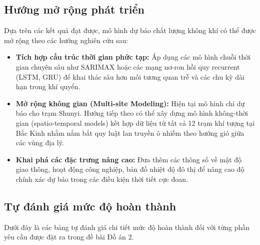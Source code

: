\documentclass[12pt,a4paper]{article}
\begin{document}
\subsection{Hướng mở rộng phát triển}
Dựa trên các kết quả đạt được, mô hình dự báo chất lượng không khí có thể được mở rộng theo các hướng nghiên cứu sau:
\begin{itemize}
    \item \textbf{Tích hợp cấu trúc thời gian phức tạp:} Áp dụng các mô hình chuỗi thời gian chuyên sâu như SARIMAX hoặc các mạng nơ-ron hồi quy recurrent (LSTM, GRU) để khai thác sâu hơn mối tương quan trễ và các chu kỳ dài hạn trong khí quyển.
    \item \textbf{Mở rộng không gian (Multi-site Modeling):} Hiện tại mô hình chỉ dự báo cho trạm Shunyi. Hướng tiếp theo có thể xây dựng mô hình không-thời gian (spatio-temporal models) kết hợp dữ liệu từ tất cả 12 trạm khí tượng tại Bắc Kinh nhằm nắm bắt quy luật lan truyền ô nhiễm theo hướng gió giữa các vùng địa lý.
    \item \textbf{Khai phá các đặc trưng nâng cao:} Đưa thêm các thông số về mật độ giao thông, hoạt động công nghiệp, bản đồ nhiệt độ đô thị để nâng cao độ chính xác dự báo trong các điều kiện thời tiết cực đoan.
\end{itemize}

\subsection{Tự đánh giá mức độ hoàn thành}
Dưới đây là các bảng tự đánh giá chi tiết mức độ hoàn thành đối với từng phần yêu cầu được đặt ra trong đề bài Đồ án 2.
\end{document}
